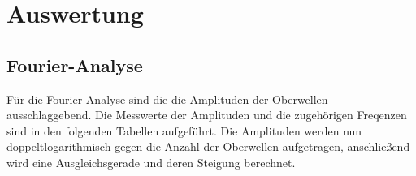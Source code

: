 \section{Auswertung}
\label{sec:Auswertung}
\subsection{Fourier-Analyse}
Für die Fourier-Analyse sind die die Amplituden der Oberwellen ausschlaggebend.
Die Messwerte der Amplituden und die zugehörigen Freqenzen sind in den folgenden
Tabellen aufgeführt.
%
%
%
Die Amplituden werden nun doppeltlogarithmisch gegen die Anzahl der Oberwellen
aufgetragen, anschließend wird eine Ausgleichsgerade und deren Steigung berechnet.
%
%
%


